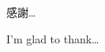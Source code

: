 \begin{acknowledgementszh}
感謝\ldots
\end{acknowledgementszh}

\begin{acknowledgementsen}
I'm glad to thank\ldots 
\end{acknowledgementsen}